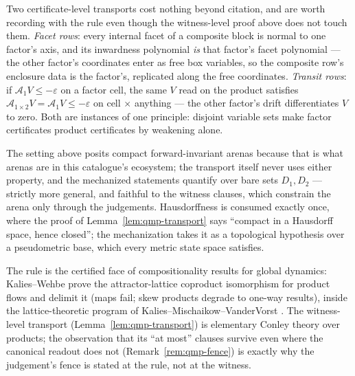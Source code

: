 \begin{bremark}\label{rem:qmp-rides}
Two certificate-level transports cost nothing beyond citation, and are
worth recording with the rule even though the witness-level proof
above does not touch them. \emph{Facet rows}: every internal facet of
a composite block is normal to one factor's axis, and its inwardness
polynomial \emph{is} that factor's facet polynomial --- the other
factor's coordinates enter as free box variables, so the composite
row's enclosure data is the factor's, replicated along the free
coordinates. \emph{Transit rows}: if $\mathcal{A}_1 V \leq
-\varepsilon$ on a factor cell, the same $V$ read on the product
satisfies $\mathcal{A}_{1 \times 2} V = \mathcal{A}_1 V \leq
-\varepsilon$ on cell $\times$ anything --- the other factor's drift
differentiates $V$ to zero. Both are instances of one principle:
disjoint variable sets make factor certificates product certificates
by weakening alone.
\end{bremark}

\begin{bremark}
\label{rem:qmp-arena}
The setting above posits compact forward-invariant arenas because that
is what arenas are in this catalogue's ecosystem; the transport itself
never uses either property, and the mechanized statements quantify over
bare sets $D_1, D_2$ --- strictly more general, and faithful to the
witness clauses, which constrain the arena only through the judgements.
Hausdorffness is consumed exactly once, where the proof of
Lemma~\ref{lem:qmp-transport} says ``compact in a Hausdorff space,
hence closed''; the mechanization takes it as a topological hypothesis
over a pseudometric base, which every metric state space satisfies.
\end{bremark}

\begin{bremark}
The rule is the certified face of compositionality results for global
dynamics: Kalies--Wehbe \cite{kalieswehbe2026} prove the
attractor-lattice coproduct isomorphism for product flows and delimit
it (maps fail; skew products degrade to one-way results), inside the
lattice-theoretic program of Kalies--Mischaikow--VanderVorst
\cite{kmv2016,kmv2022}. The witness-level transport
(Lemma~\ref{lem:qmp-transport}) is elementary Conley theory
\cite{conley1978} over products; the observation that its ``at most''
clauses survive even where the canonical readout does not
(Remark~\ref{rem:qmp-fence}) is exactly why the judgement's fence is
stated at the rule, not at the witness.
\end{bremark}

